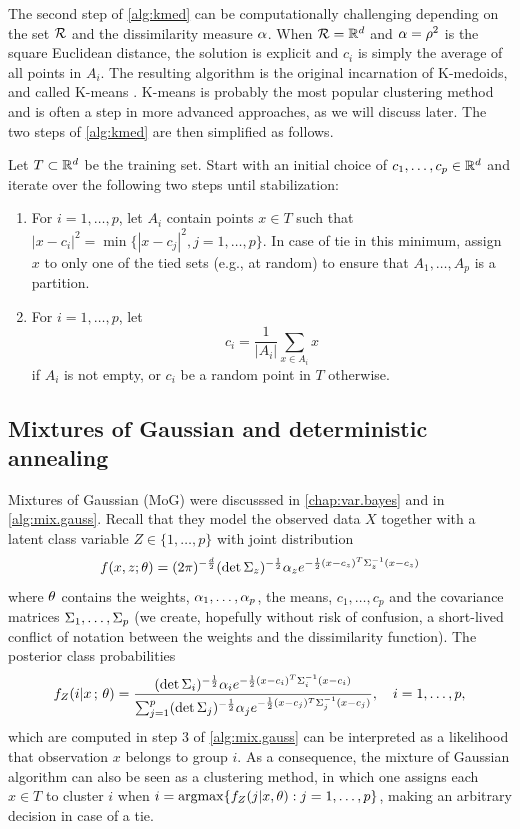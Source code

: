 The second step of \cref{alg:kmed} can  be computationally challenging depending on the set ${\mathcal R}$ and the dissimilarity measure $\alpha$. When ${\mathcal R} = {\mathbb{R}}^d$ and $\alpha = \rho^2$ is the square Euclidean distance, the solution is explicit and $c_i$ is simply the average of all points in $A_i$. The resulting algorithm is the original incarnation of K-medoids, and called K-means \cite{steinhaus1956division,lloyd1982least,macqueen1967some}. K-means is probably  the most popular clustering method and is often a step in  more advanced approaches, as we will discuss later. The two steps of \cref{alg:kmed} are then simplified as follows.
\begin{algorithm}[K-means] 
\label{alg:kmeans}
Let $T\subset {\mathbb{R}}^d$ be the training set.
 Start with an initial choice of $c_1, \ldots, c_p\in {\mathbb{R}}^d$ and iterate over the following two steps until stabilization:
\begin{enumerate}[leftmargin=1cm]
\item For $i = 1, \ldots, p$, let $A_i$ contain points $x\in T$ such that $|x - c_i|^2 = \min\{|x - c_j|^2, j=1, \ldots, p\}$. In case of tie in this minimum, assign $x$ to only one of the tied sets (e.g., at random) to ensure that $A_1, \ldots, A_p$ is a partition.
\item For $i=1, \ldots, p$, let 
\[
c_i = \frac1{|A_i|} \sum_{x\in A_i} x
\]
if $A_i$ is not empty, or $c_i$ be a random point in $T$ otherwise.
\end{enumerate}
\end{algorithm}

\subsection{Mixtures of Gaussian and deterministic annealing}
Mixtures of Gaussian (MoG) %
were discusssed in \cref{chap:var.bayes} and in \cref{alg:mix.gauss}.  
Recall that they model the observed data $X$ together with a latent class variable $Z\in \{1, \ldots, p\}$ with joint distribution
\[
f(x,z;\theta) =  (2\pi)^{-\frac d 2} (\det \Sigma_z)^{-\frac12} \alpha_z e^{-\frac12 
(x-c_z)^T\Sigma_z^{-1} (x-c_z)}
\]
where $\theta$ contains the weights, $\alpha_1, \ldots,
\alpha_p$, the means, $c_1, \ldots,
c_p$ and the covariance matrices $\Sigma_1, \ldots, \Sigma_p$ (we create, hopefully without risk of confusion, a short-lived conflict of notation between the weights and the dissimilarity function). The posterior class probabilities 
\[
f_Z(i|x\,;\,\theta) = \frac{(\det \Sigma_i)^{-\frac12} \alpha_i e^{- \frac12
(x-c_i)^T\Sigma_i^{-1} (x-c_i)}}{\sum_{j=1}^p (\det \Sigma_j)^{-\frac12} \alpha_j e^{-\frac12
(x-c_j)^T\Sigma_j^{-1} (x-c_j)}}, \quad
i=1, \ldots, p,
\]
which are computed in step 3 of \cref{alg:mix.gauss} can be interpreted as a likelihood that observation $x$ belongs to group $i$.  As a consequence, the mixture of Gaussian algorithm can also be seen as a clustering method, in which one assigns each $x\in T$ to cluster $i$ when $i = \operatorname*{argmax}\{f_Z(j|x, \theta): j=1, \ldots, p\}$, making an arbitrary decision in case of a tie.

